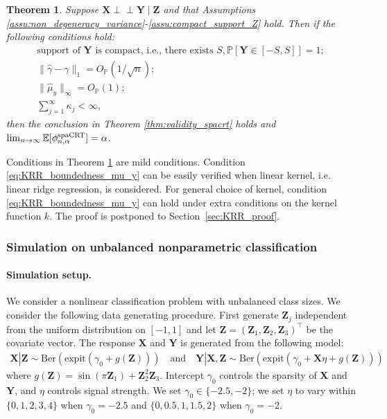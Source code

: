 \documentclass[12pt]{article}
\newtheorem{theorem}{Theorem}
\theoremstyle{definition}
\newcommand{\indep}{\perp \!\!\! \perp}
\def\P{\mathbb{P}}
\def\P{\mathbb{P}}
\newcommand{\E}{\mathbb E}								%
\renewcommand{\P}{\mathbb{P}}							%
\newcommand{\expit}{\mathrm{expit}}                 	%
\newcommand{\prx}{\bm X}								%
\newcommand{\prz}{\bm Z}								%
\newcommand{\pry}{{\bm Y}}								%
\newcommand{\spacrt}{\textnormal{spaCRT}}               %
\begin{document}
\begin{theorem}\label{thm:nonparametric_ml_spacrt}
  Suppose $\prx\indep\pry \mid \prz$ and that Assumptions \ref{assu:non_degeneracy_variance}-\ref{assu:compact_support_Z} hold. Then if the following conditions hold:
  \begin{align}
    \text{support of $\pry$ is compact, i.e., there exists }S, \P[\pry\in[-S,S]]=1;\label{eq:KRR_compact_support_Y}\\
    \|\widehat{\gamma}-\gamma\|_1=O_\P(1/\sqrt{n});\label{eq:KRR_mu_x_consistency}\\
    \|\widehat{\mu}_{y}\|_{\infty}=O_\P(1);\label{eq:KRR_boundedness_mu_y}\\
    \sum_{j=1}^{\infty}\kappa_j<\infty,\label{eq:KRR_kernel_function}
  \end{align}
  then the conclusion in Theorem \ref{thm:validity_spacrt} holds and $\lim_{n\rightarrow\infty}\E[\phi_{n,\alpha}^{\spacrt}]=\alpha$.
\end{theorem}

Conditions in Theorem \ref{thm:nonparametric_ml_spacrt} are mild conditions. Condition \eqref{eq:KRR_boundedness_mu_y} can be easily verified when linear kernel, i.e. linear ridge regression, is considered. For general choice of kernel, condition \eqref{eq:KRR_boundedness_mu_y} can hold under extra conditions on the kernel function $k$. The proof is postponed to Section~\ref{sec:KRR_proof}.


\subsubsection{Simulation on unbalanced nonparametric classification}\label{sec:simulation_nonparametric_RF_classification}

\paragraph{Simulation setup.}
We consider a nonlinear classification problem with unbalanced class sizes. We consider the following data generating procedure. First generate  $\prz_j$ independent from the uniform distribution on $[-1,1]$ and let $\prz=(\prz_1,\prz_2,\prz_3)^\top$ be the covariate vector. The response $\prx$ and $\pry$ is generated from the following model:
\begin{align*}
  \prx|\prz\sim\mathrm{Ber}(\expit(\gamma_0+g(\prz)))\quad\text{and}\quad \pry|\prx,\prz\sim\mathrm{Ber}(\expit(\gamma_0+\prx\eta+g(\prz)))
\end{align*}
where  $g(\prz)=\sin(\pi\prz_1)+\prz_2^2\prz_3$. Intercept $\gamma_0$ controls the sparsity of $\prx$ and $\pry$, and $\eta$ controls signal strength. We set $\gamma_0\in\{-2.5,-2\}$; we set $\eta$ to vary within $\{0, 1,2,3,4\}$ when $\gamma_0=-2.5$ and $\{0,0.5,1,1.5,2\}$ when $\gamma_0=-2$. 
\end{document}
